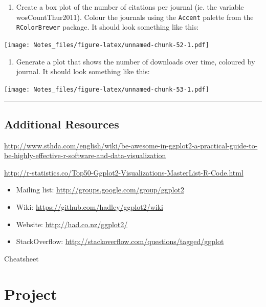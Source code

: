 \documentclass[
]{book}
\providecommand{\tightlist}{%
  \setlength{\itemsep}{0pt}\setlength{\parskip}{0pt}}
\begin{document}
\begin{enumerate}
\def\labelenumi{\arabic{enumi}.}
\setcounter{enumi}{2}
\tightlist
\item
  Create a box plot of the number of citations per journal (ie. the variable wosCountThur2011). Colour the journals using the \texttt{Accent} palette from the \texttt{RColorBrewer} package. It should look something like this:
\end{enumerate}

\texttt{[image: Notes\_files/figure-latex/unnamed-chunk-52-1.pdf]}

\begin{enumerate}
\def\labelenumi{\arabic{enumi}.}
\setcounter{enumi}{3}
\tightlist
\item
  Generate a plot that shows the number of downloads over time, coloured by journal. It should look something like this:
\end{enumerate}

\texttt{[image: Notes\_files/figure-latex/unnamed-chunk-53-1.pdf]}

\begin{center}\rule{0.5\linewidth}{0.5pt}\end{center}

\hypertarget{additional-resources}{%
\section{Additional Resources}\label{additional-resources}}

\url{http://www.sthda.com/english/wiki/be-awesome-in-ggplot2-a-practical-guide-to-be-highly-effective-r-software-and-data-visualization}

\url{http://r-statistics.co/Top50-Ggplot2-Visualizations-MasterList-R-Code.html}

\begin{itemize}
\tightlist
\item
  Mailing list: \url{http://groups.google.com/group/ggplot2}
\item
  Wiki: \url{https://github.com/hadley/ggplot2/wiki}
\item
  Website: \url{http://had.co.nz/ggplot2/}
\item
  StackOverflow: \url{http://stackoverflow.com/questions/tagged/ggplot}
\end{itemize}

Cheatsheet

\hypertarget{project}{%
\chapter{Project}\label{project}}
\end{document}
